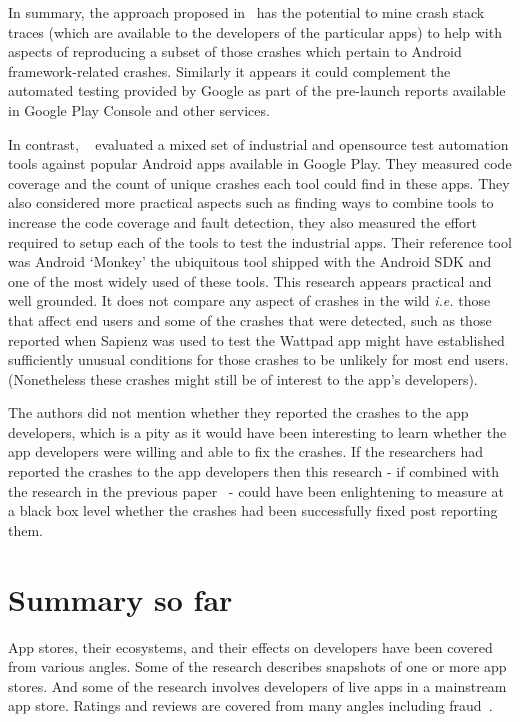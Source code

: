 In summary, the approach proposed in~ has the potential to mine crash stack traces (which are available to the developers of the particular apps) to help with aspects of reproducing a subset of those crashes which pertain to Android framework-related crashes. Similarly it appears it could complement the automated testing provided by Google as part of the pre-launch reports available in Google Play Console and other services. 

In contrast, ~ evaluated a mixed set of industrial and opensource test automation tools against popular Android apps available in Google Play. They measured code coverage and the count of unique crashes each tool could find in these apps. They also considered more practical aspects such as finding ways to combine tools to increase the code coverage and fault detection, they also measured the effort required to setup each of the tools to test the industrial apps. Their reference tool was Android `Monkey' the ubiquitous tool shipped with the Android SDK and one of the most widely used of these tools. This research appears practical and well grounded. It does not compare any aspect of crashes in the wild \emph{i.e.} those that affect end users and some of the crashes that were detected, such as those reported when Sapienz was used to test the Wattpad app might have established sufficiently unusual conditions for those crashes to be unlikely for most end users. (Nonetheless these crashes might still be of interest to the app's developers). 

The authors did not mention whether they reported the crashes to the app developers, which is a pity as it would have been interesting to learn whether the app developers were willing and able to fix the crashes. If the researchers had reported the crashes to the app developers then this research - if combined with the research in the previous paper~ - could have been enlightening to measure at a black box level whether the crashes had been successfully fixed post reporting them.


\section{Summary so far} %
App stores, their ecosystems, and their effects on developers have been covered from various angles. Some of the research describes snapshots of one or more app stores. And some of the research involves developers of live apps in a mainstream app store. Ratings and reviews are covered from many angles including fraud~. 

